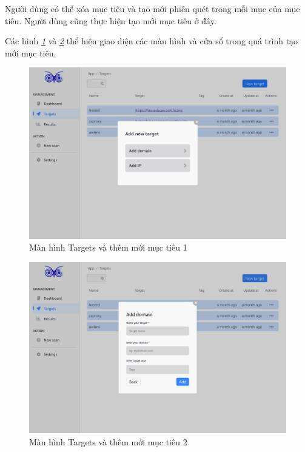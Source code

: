 Người dùng có thể xóa mục tiêu và tạo mới phiên quét trong mỗi mục của mục tiêu.
Người dùng cũng thực hiện tạo mới mục tiêu ở đây.

Các hình \textit{\ref{fig:ManHinhTargetsVaThemMoiMucTieu1} } 
và \textit{\ref{fig:ManHinhTargetsVaThemMoiMucTieu2} } thể hiện giao diện các màn hình và cửa sổ trong quá trình tạo mới mục tiêu.

\begin{figure}[H]
      \centering
      \includegraphics[width=\textwidth]{applied-thesis-chapters/chapter-6/Màn hình Targets và thêm mới mục tiêu 1.png}
      \caption{Màn hình Targets và thêm mới mục tiêu 1}
      \label{fig:ManHinhTargetsVaThemMoiMucTieu1}
\end{figure}

\begin{figure}[H]
      \centering
      \includegraphics[width=\textwidth]{applied-thesis-chapters/chapter-6/Màn hình Targets và thêm mới mục tiêu 2.png}
      \caption{Màn hình Targets và thêm mới mục tiêu 2}
      \label{fig:ManHinhTargetsVaThemMoiMucTieu2}
\end{figure}

